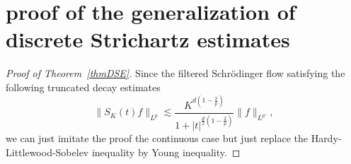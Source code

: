 \documentclass[10pt,a4paper]{article}
\begin{document}
  \section{proof of the generalization of discrete Strichartz estimates}
  \begin{proof}[Proof of Theorem~\ref{thmDSE}]
    Since the filtered Schr\"odinger flow satisfying the following truncated
    decay estimates
    \[ \|S_K(t)f\|_{L^p} \lesssim
    \frac{K^{d(1-\frac2p)}}{1+|t|^{\frac{d}2(1-\frac2p)}}\|f\|_{L^{p'}},\]
    we can just imitate the proof the continuous case but just replace the 
    Hardy-Littlewood-Sobelev inequality by Young inequality.
  \end{proof}
\end{document}
